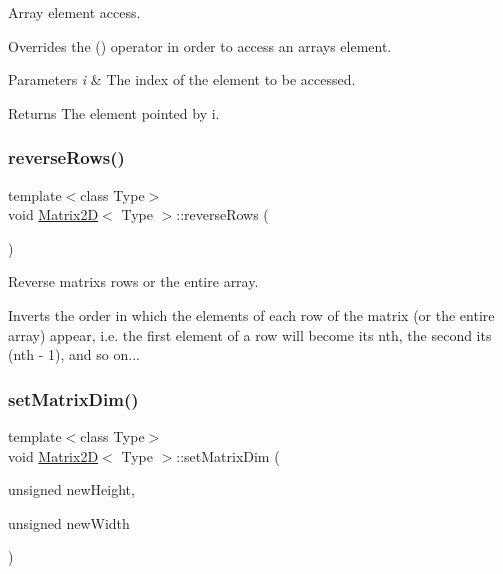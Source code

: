 Array element access. 

Overrides the \textquotesingle{}()\textquotesingle{} operator in order to access an array\textquotesingle{}s element. 
\begin{DoxyParams}{Parameters}
{\em i} & The index of the element to be accessed. \\
\hline
\end{DoxyParams}
\begin{DoxyReturn}{Returns}
The element pointed by i. 
\end{DoxyReturn}
\mbox{\label{classMatrix2D_aaaefe293f1a0549afb2e506b71b18490}} 
\subsubsection{\texorpdfstring{reverse\+Rows()}{reverseRows()}}
{\footnotesize\ttfamily template$<$class Type$>$ \\
void \hyperlink{classMatrix2D}{Matrix2D}$<$ Type $>$\+::reverse\+Rows (\begin{DoxyParamCaption}{ }\end{DoxyParamCaption})\hspace{0.3cm}{\ttfamily [inline]}}



Reverse matrix\textquotesingle{}s rows or the entire array. 

Inverts the order in which the elements of each row of the matrix (or the entire array) appear, i.\+e. the first element of a row will become its nth, the second its (nth -\/ 1), and so on... \mbox{\label{classMatrix2D_abf7025332a5f4f75b172fb1a3ad56176}} 
\subsubsection{\texorpdfstring{set\+Matrix\+Dim()}{setMatrixDim()}\hspace{0.1cm}{\footnotesize\ttfamily [1/2]}}
{\footnotesize\ttfamily template$<$class Type$>$ \\
void \hyperlink{classMatrix2D}{Matrix2D}$<$ Type $>$\+::set\+Matrix\+Dim (\begin{DoxyParamCaption}\item[{unsigned}]{new\+Height,  }\item[{unsigned}]{new\+Width }\end{DoxyParamCaption})\hspace{0.3cm}{\ttfamily [inline]}}



